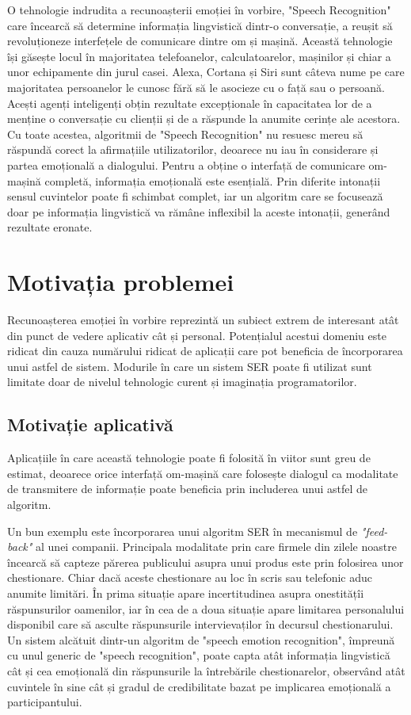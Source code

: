 \documentclass[a4paper,12pt]{book}
\begin{document}
				O tehnologie indrudita a recunoașterii emoției în vorbire, "Speech Recognition" care încearcă să determine informația lingvistică dintr-o conversație, a reușit să revoluționeze interfețele de comunicare dintre om și mașină. Această tehnologie își găsește locul în majoritatea telefoanelor, calculatoarelor, mașinilor și chiar a unor echipamente din jurul casei. Alexa, Cortana și Siri sunt câteva nume pe care majoritatea persoanelor le cunosc fără să le asocieze cu o față sau o persoană. Acești agenți inteligenți obțin rezultate excepționale în capacitatea lor de a menține o conversație cu clienții și de a răspunde la anumite cerințe ale acestora. Cu toate acestea, algoritmii de "Speech Recognition" nu resuesc mereu să răspundă corect la afirmațiile utilizatorilor, deoarece nu iau în considerare și partea emoțională a dialogului. Pentru a obține o interfață de comunicare om-mașină completă, informația emoțională este esențială. Prin diferite intonații sensul cuvintelor poate fi schimbat complet, iar un algoritm care se focusează doar pe informația lingvistică va rămâne inflexibil la aceste intonații, generând rezultate eronate. \par
					

		\section{Motivația problemei}
		Recunoașterea emoției în vorbire reprezintă un subiect extrem de interesant atât din punct de vedere aplicativ cât și personal. Potențialul acestui domeniu este ridicat din cauza numărului ridicat de aplicații care pot beneficia de încorporarea unui astfel de sistem. Modurile în care un sistem SER poate fi utilizat sunt limitate doar de nivelul tehnologic curent și imaginația programatorilor.
			\subsection{Motivație aplicativă}				
					Aplicațiile în care această tehnologie poate fi folosită în viitor sunt greu de estimat, deoarece orice interfață om-mașină care folosește dialogul ca modalitate de transmitere de informație poate beneficia prin includerea unui astfel de algoritm.\par
					
					Un bun exemplu este încorporarea unui algoritm SER în mecanismul de \textit{"feed-back"} al unei companii. Principala modalitate prin care firmele din zilele noastre încearcă să capteze părerea publicului asupra unui produs este prin folosirea unor chestionare. Chiar dacă aceste chestionare au loc în scris sau telefonic aduc anumite limitări. În prima situație apare incertitudinea asupra onestitățîi răspunsurilor oamenilor, iar în cea de a doua situație apare limitarea personalului disponibil care să asculte răspunsurile intervievaților în decursul chestionarului. Un sistem alcătuit dintr-un algoritm de "speech emotion recognition", împreună cu unul generic de "speech recognition", poate capta atât informația lingvistică cât și cea emoțională din răspunsurile la întrebările chestionarelor, observând atât cuvintele în sine cât și gradul de credibilitate bazat pe implicarea emoțională a participantului. \par
					
\end{document}
